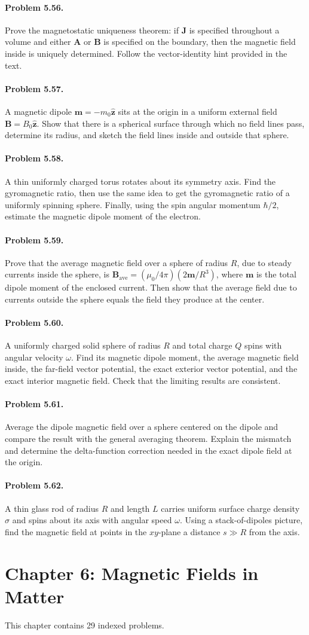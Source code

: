 \documentclass{aa}
\newcommand{\problemstatement}[2]{%
\paragraph{Problem #1.}#2\par\medskip
}
\begin{document}
\problemstatement{5.56}{Prove the magnetostatic uniqueness theorem: if \(\mathbf J\) is specified throughout a volume and either \(\mathbf A\) or \(\mathbf B\) is specified on the boundary, then the magnetic field inside is uniquely determined. Follow the vector-identity hint provided in the text.}
\problemstatement{5.57}{A magnetic dipole \(\mathbf m=-m_0\hat{\mathbf z}\) sits at the origin in a uniform external field \(\mathbf B=B_0\hat{\mathbf z}\). Show that there is a spherical surface through which no field lines pass, determine its radius, and sketch the field lines inside and outside that sphere.}
\problemstatement{5.58}{A thin uniformly charged torus rotates about its symmetry axis. Find the gyromagnetic ratio, then use the same idea to get the gyromagnetic ratio of a uniformly spinning sphere. Finally, using the spin angular momentum \(\hbar/2\), estimate the magnetic dipole moment of the electron.}
\problemstatement{5.59}{Prove that the average magnetic field over a sphere of radius \(R\), due to steady currents inside the sphere, is \(\mathbf B_{\mathrm{ave}} = (\mu_0/4\pi)(2\mathbf m/R^3)\), where \(\mathbf m\) is the total dipole moment of the enclosed current. Then show that the average field due to currents outside the sphere equals the field they produce at the center.}
\problemstatement{5.60}{A uniformly charged solid sphere of radius \(R\) and total charge \(Q\) spins with angular velocity \(\omega\). Find its magnetic dipole moment, the average magnetic field inside, the far-field vector potential, the exact exterior vector potential, and the exact interior magnetic field. Check that the limiting results are consistent.}
\problemstatement{5.61}{Average the dipole magnetic field over a sphere centered on the dipole and compare the result with the general averaging theorem. Explain the mismatch and determine the delta-function correction needed in the exact dipole field at the origin.}
\problemstatement{5.62}{A thin glass rod of radius \(R\) and length \(L\) carries uniform surface charge density \(\sigma\) and spins about its axis with angular speed \(\omega\). Using a stack-of-dipoles picture, find the magnetic field at points in the \(xy\)-plane a distance \(s\gg R\) from the axis.}

\section{Chapter 6: Magnetic Fields in Matter}
This chapter contains 29 indexed problems.
\end{document}

